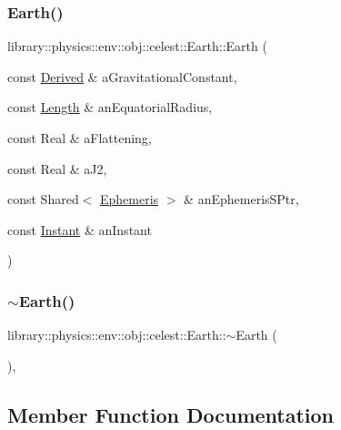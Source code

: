 \subsubsection{\texorpdfstring{Earth()}{Earth()}}
{\footnotesize\ttfamily library\+::physics\+::env\+::obj\+::celest\+::\+Earth\+::\+Earth (\begin{DoxyParamCaption}\item[{const \hyperlink{classlibrary_1_1physics_1_1units_1_1_derived}{Derived} \&}]{a\+Gravitational\+Constant,  }\item[{const \hyperlink{classlibrary_1_1physics_1_1units_1_1_length}{Length} \&}]{an\+Equatorial\+Radius,  }\item[{const Real \&}]{a\+Flattening,  }\item[{const Real \&}]{a\+J2,  }\item[{const Shared$<$ \hyperlink{classlibrary_1_1physics_1_1env_1_1_ephemeris}{Ephemeris} $>$ \&}]{an\+Ephemeris\+S\+Ptr,  }\item[{const \hyperlink{classlibrary_1_1physics_1_1time_1_1_instant}{Instant} \&}]{an\+Instant }\end{DoxyParamCaption})}

\mbox{\label{classlibrary_1_1physics_1_1env_1_1obj_1_1celest_1_1_earth_a93fbd2015a7c7d786654919197c63963}} 
\subsubsection{\texorpdfstring{$\sim$\+Earth()}{~Earth()}}
{\footnotesize\ttfamily library\+::physics\+::env\+::obj\+::celest\+::\+Earth\+::$\sim$\+Earth (\begin{DoxyParamCaption}{ }\end{DoxyParamCaption})\hspace{0.3cm}{\ttfamily [override]}, {\ttfamily [virtual]}}



\subsection{Member Function Documentation}
\mbox{\label{classlibrary_1_1physics_1_1env_1_1obj_1_1celest_1_1_earth_aca39bec00a2046a3fcef9bf22be52428}} 
